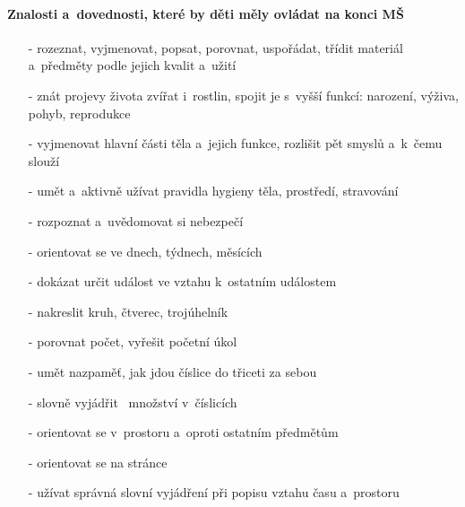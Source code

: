 			\paragraph{Znalosti a~dovednosti, které by děti měly ovládat na konci MŠ}
				\vspace{-2mm}
				\begin{itemize}
					\setlength\itemsep{-2mm}
					\item[-] rozeznat, vyjmenovat, popsat, porovnat, uspořádat, třídit materiál a~předměty podle jejich kvalit a~užití
					\item[-] znát projevy života zvířat i~rostlin, spojit je s vyšší funkcí: narození, výživa, pohyb, reprodukce
					\item[-] vyjmenovat hlavní části těla a~jejich funkce, rozlišit pět smyslů a~k čemu slouží
					\item[-] umět a~aktivně užívat pravidla hygieny těla, prostředí, stravování
					\item[-] rozpoznat a~uvědomovat si nebezpečí
					\item[-] orientovat se ve dnech, týdnech, měsících
					\item[-] dokázat určit událost ve vztahu k ostatním událostem
					\item[-] nakreslit kruh, čtverec, trojúhelník
					\item[-] porovnat počet, vyřešit početní úkol
					\item[-] umět nazpaměť, jak jdou číslice do třiceti za sebou 
					\item[-] slovně vyjádřit  množství v~číslicích 
					\item[-] orientovat se v prostoru a~oproti ostatním předmětům
					\item[-] orientovat se na stránce
					\item[-] užívat správná slovní vyjádření při popisu vztahu času a~prostoru
				\end{itemize}

